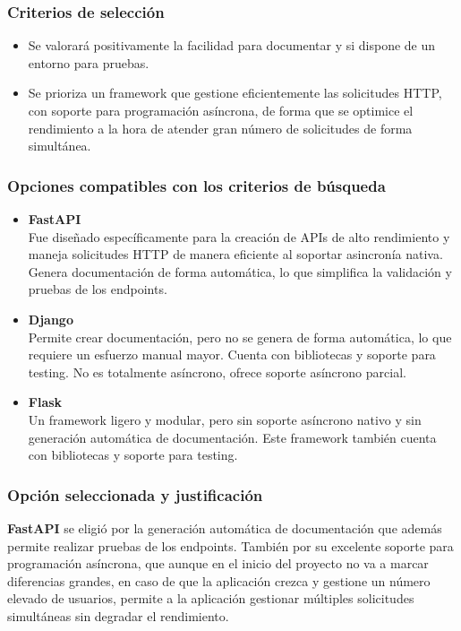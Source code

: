 \subsubsection{Criterios de selección}
\begin{itemize}
    \item Se valorará positivamente la facilidad para documentar y si dispone de un entorno para pruebas.
    \item Se prioriza un framework que gestione eficientemente las solicitudes HTTP, con soporte para programación asíncrona, de forma que se optimice el rendimiento a la hora de atender gran número de solicitudes de forma simultánea.
\end{itemize}

\subsubsection{Opciones compatibles con los criterios de búsqueda}
\begin{itemize}
    \item \textbf{FastAPI}\\
        Fue diseñado específicamente para la creación de APIs de alto rendimiento y maneja solicitudes HTTP de manera eficiente al soportar asincronía nativa.
        Genera documentación de forma automática, lo que simplifica la validación y pruebas de los endpoints.
    \item \textbf{Django}\\
        Permite crear documentación, pero no se genera de forma automática, lo que requiere un esfuerzo manual mayor. 
        Cuenta con bibliotecas y soporte para testing. No es totalmente asíncrono, ofrece soporte asíncrono parcial.
    \item \textbf{Flask}\\
        Un framework ligero y modular, pero sin soporte asíncrono nativo y sin generación automática de documentación. Este framework también cuenta con bibliotecas y soporte para testing.    
\end{itemize}

\subsubsection{Opción seleccionada y justificación}
\textbf{FastAPI} se eligió por la generación automática de documentación que además permite realizar pruebas de los endpoints. También por su excelente soporte para programación asíncrona, que aunque en el inicio del proyecto no va a marcar diferencias grandes, en caso de que la aplicación crezca y gestione un número elevado de usuarios, permite a la aplicación gestionar múltiples solicitudes simultáneas sin degradar el rendimiento\cite{Lathkar2023}.


